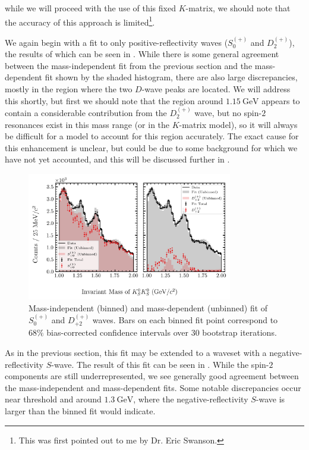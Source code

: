 while we will proceed with the use of this fixed $K$-matrix, we should note that the accuracy of this approach is limited\footnote{This was first pointed out to me by Dr. Eric Swanson.}.

We again begin with a fit to only positive-reflectivity waves ($S_0^{(+)}$ and $D_2^{(+)}$), the results of which can be seen in . While there is some general agreement between the mass-independent fit from the previous section and the mass-dependent fit shown by the shaded histogram, there are also large discrepancies, mostly in the region where the two $D$-wave peaks are located. We will address this shortly, but first we should note that the region around $\SI{1.15}{\giga\electronvolt}$ appears to contain a considerable contribution from the $D_2^{(+)}$ wave, but no spin-$2$ resonances exist in this mass range (or in the $K$-matrix model), so it will always be difficult for a model to account for this region accurately. The exact cause for this enhancement is unclear, but could be due to some background for which we have not yet accounted, and this will be discussed further in .

\begin{figure}
  \begin{center}
    \includegraphics[width=0.8\textwidth]{figures/binned_and_unbinned_fit_chisqdof_3.4_splot_D_1s_2b_phase_factor_waves491_uncertainty_bootstrap-SE.png}
  \end{center}
  \caption{Mass-independent (binned) and mass-dependent (unbinned) fit of $S_{0}^{(+)}$ and $D_{+2}^{(+)}$ waves. Bars on each binned fit point correspond to $68\%$ bias-corrected confidence intervals over $ 30 $ bootstrap iterations.}\label{fig:unbinned-fit-chisqdof-3.4-Sp-D2p}
\end{figure}

As in the previous section, this fit may be extended to a waveset with a negative-reflectivity $S$-wave. The result of this fit can be seen in . While the spin-$2$ components are still underrepresented, we see generally good agreement between the mass-independent and mass-dependent fits. Some notable discrepancies occur near threshold and around $\SI{1.3}{\giga\electronvolt}$, where the negative-reflectivity $S$-wave is larger than the binned fit would indicate.

